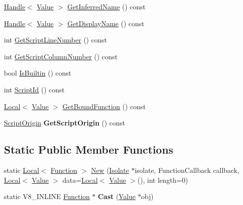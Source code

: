 \begin{DoxyCompactItemize}
\item 
\hyperlink{classv8_1_1Handle}{Handle}$<$ \hyperlink{classv8_1_1Value}{Value} $>$ \hyperlink{classv8_1_1Function_a5bd3ad2f8144be5d9b383b1cd9b30df5}{Get\-Inferred\-Name} () const 
\item 
\hyperlink{classv8_1_1Handle}{Handle}$<$ \hyperlink{classv8_1_1Value}{Value} $>$ \hyperlink{classv8_1_1Function_a02e860b1d4f1b58a0c437fec8ea9e290}{Get\-Display\-Name} () const 
\item 
int \hyperlink{classv8_1_1Function_ae64de1b9dc1ea5dc4f419a88808c12c5}{Get\-Script\-Line\-Number} () const 
\item 
int \hyperlink{classv8_1_1Function_abfe6a9251c5dfc995b83dcf3032fdc86}{Get\-Script\-Column\-Number} () const 
\item 
bool \hyperlink{classv8_1_1Function_a4279e2bfca281cda9afdaf86c87d644d}{Is\-Builtin} () const 
\item 
int \hyperlink{classv8_1_1Function_afa208e62e702f6d61ba0a4250ba3f2cf}{Script\-Id} () const 
\item 
\hyperlink{classv8_1_1Local}{Local}$<$ \hyperlink{classv8_1_1Value}{Value} $>$ \hyperlink{classv8_1_1Function_a937dc089e1ef728eec4a628072250e4d}{Get\-Bound\-Function} () const 
\item 
\hypertarget{classv8_1_1Function_af9c77c9bcbf698727071c7153e7c2513}{\hyperlink{classv8_1_1ScriptOrigin}{Script\-Origin} {\bfseries Get\-Script\-Origin} () const }\label{classv8_1_1Function_af9c77c9bcbf698727071c7153e7c2513}

\end{DoxyCompactItemize}
\subsection*{Static Public Member Functions}
\begin{DoxyCompactItemize}
\item 
static \hyperlink{classv8_1_1Local}{Local}$<$ \hyperlink{classv8_1_1Function}{Function} $>$ \hyperlink{classv8_1_1Function_a56e303d1019aaa7954de668aee8486f7}{New} (\hyperlink{classv8_1_1Isolate}{Isolate} $\ast$isolate, Function\-Callback callback, \hyperlink{classv8_1_1Local}{Local}$<$ \hyperlink{classv8_1_1Value}{Value} $>$ data=\hyperlink{classv8_1_1Local}{Local}$<$ \hyperlink{classv8_1_1Value}{Value} $>$(), int length=0)
\item 
\hypertarget{classv8_1_1Function_af24f38bcc0769519816cda1f6a154ff8}{static V8\-\_\-\-I\-N\-L\-I\-N\-E \hyperlink{classv8_1_1Function}{Function} $\ast$ {\bfseries Cast} (\hyperlink{classv8_1_1Value}{Value} $\ast$obj)}\label{classv8_1_1Function_af24f38bcc0769519816cda1f6a154ff8}

\end{DoxyCompactItemize}
